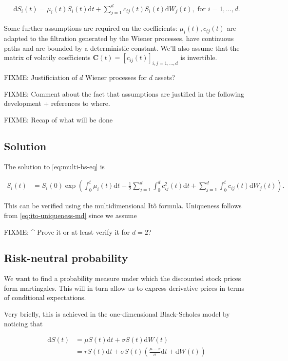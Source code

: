 \documentclass[a4paper]{article}
\begin{document}
\begin{align}\label{eq:multi-bs-eq}
  \mathrm{d}S_i(t) = \mu_i(t) S_i(t) \mathrm{d}t + \sum_{j=1}^{d} c_{ij}(t) S_i(t) \mathrm{d}W_j(t), \text{ for } i = 1,\ldots,d.
\end{align}

Some further assumptions are required on the coefficients: $\mu_i(t), c_{ij}(t)$ are adapted to the filtration generated by the Wiener processes, have continuous paths and are bounded by a deterministic constant. We'll also assume that the matrix of volatily coefficients $\mathbf{C}(t) = [c_{ij}(t)]_{i,j=1,\ldots,d}$ is invertible.

FIXME: Justificiation of $d$ Wiener processes for $d$ assets?

FIXME: Comment about the fact that assumptions are justified in the following development + references to where.

FIXME: Recap of what will be done

\subsection{Solution}

The solution to \eqref{eq:multi-bs-eq} is

\begin{align*}
  S_i(t) &= S_i(0) \exp \left( \int_0^t \mu_i(t) \mathrm{d}t - \frac{1}{2} \sum_{j=1}^{d} \int_0^d c_{ij}^2(t) \mathrm{d}t + \sum_{j=1}^d \int_0^t c_{ij}(t) \mathrm{d}W_j(t) \right).
\end{align*}

This can be verified using the multidimensional It\^o formula. Uniqueness follows from \eqref{eq:ito-uniqueness-md} since we assume

FIXME: \^{} Prove it or at least verify it for $d=2$?

\pagebreak
\subsection{Risk-neutral probability}

We want to find a probability measure under which the discounted stock prices form martingales. This will in turn allow us to express derivative prices in terms of conditional expectations.

Very briefly, this is achieved in the one-dimensional Black-Scholes model by noticing that

\begin{align*}
  \mathrm{d}S(t)
  &= \mu S(t) \mathrm{d}t + \sigma S(t) \mathrm{d}W(t)\\
  &= r S(t) \mathrm{d}t + \sigma S(t) \left(\frac{\mu - r}{\sigma} \mathrm{d}t + \mathrm{d}W(t)\right)
\end{align*}
\end{document}
